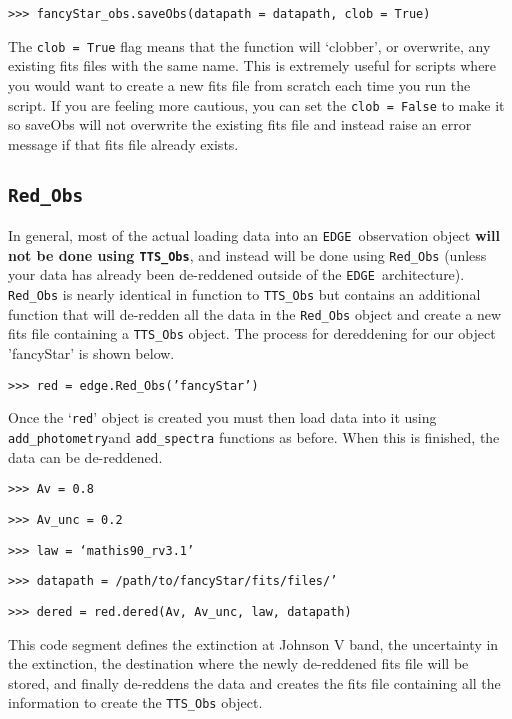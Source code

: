 \documentclass{article}
\newcommand{\edge}{\texttt{EDGE }}
\begin{document}
\vspace{2mm}
\texttt{>>> fancyStar\_obs.saveObs(datapath = datapath, clob = True)}
\vspace{2mm}

\noindent The \texttt{clob = True} flag means that the function will `clobber', or overwrite, any existing fits files with the same name. This is extremely useful for scripts where you would want to create a new fits file from scratch each time you run the script. If you are feeling more cautious, you can set the \texttt{clob = False} to make it so saveObs will not overwrite the existing fits file and instead raise an error message if that fits file already exists.

\subsection{\texttt{Red\_Obs}}

\noindent In general, most of the actual loading data into an \edge observation object \textbf{will not be done using \texttt{TTS\_Obs}}, and instead will be done using \texttt{Red\_Obs} (unless your data has already been de-reddened outside of the \edge architecture). \texttt{Red\_Obs} is nearly identical in function to \texttt{TTS\_Obs} but contains an additional function that will de-redden all the data in the \texttt{Red\_Obs} object and create a new fits file containing a \texttt{TTS\_Obs} object.
The process for dereddening for our object 'fancyStar' is shown below.

\vspace{2mm}
\texttt{>>> red =  edge.Red\_Obs('fancyStar')}
\vspace{2mm}

\noindent Once the `\texttt{red}' object is created you must then load data into it using \texttt{add\_photometry}and \texttt{add\_spectra} functions as before. When this is finished, the data can be de-reddened.

\vspace{2mm}
\texttt{>>> Av = 0.8}

\texttt{>>> Av\_unc = 0.2}

\texttt{>>> law = `mathis90\_rv3.1'}

\texttt{>>> datapath = /path/to/fancyStar/fits/files/'}

\texttt{>>> dered = red.dered(Av, Av\_unc, law, datapath)}
\vspace{2mm}

\noindent This code segment defines the extinction at Johnson V band, the uncertainty in the extinction, the destination where the newly de-reddened fits file will be stored, and finally de-reddens the data and creates the fits file containing all the information to create the \texttt{TTS\_Obs} object. 
 
\end{document}
